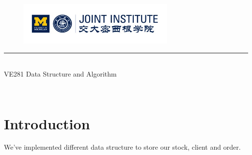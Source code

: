 \documentclass{article}
\begin{document}
\renewcommand\arraystretch{1.5}


\thispagestyle{empty}

\begin{center}
\begin{large}
\begin{figure}[!htbp]
\centering
\includegraphics[width=0.7\textwidth]{Logo2.png}
\end{figure}
\hrule
\vspace*{0.25cm}
 \\ 
VE281 Data Structure and Algorithm\\
\end{large}
\hrulefill

\vspace*{5cm}

\begin{Large}
 \\
\end{Large}
\vspace*{2em}
\begin{large}
\end{large}
\end{center}
\newpage
\setmainfont{Optima}
\tableofcontents
\newpage
\setcounter{page}{1}
\section{Introduction}
\par We've implemented different data structure to store our stock, client and order.
\end{document}
